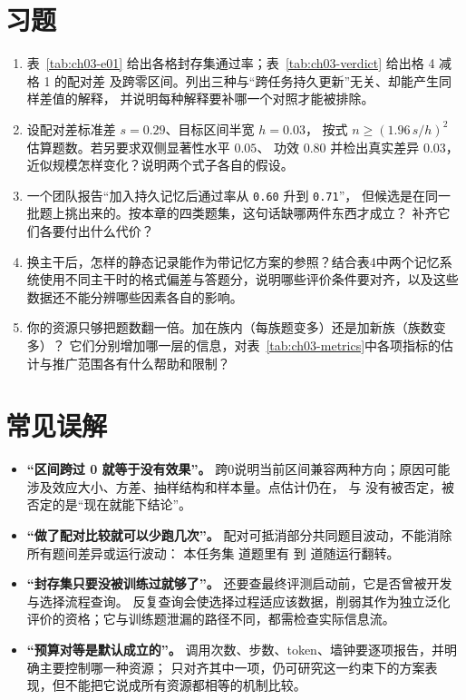 \section*{习题}
\begin{enumerate}[label=3-\arabic*.,ref=3-\arabic*]
  \item\label{ex:ch03-1} 表~\ref{tab:ch03-e01} 给出各格封存集通过率；表~\ref{tab:ch03-verdict} 给出格 4 减格 1 的配对差  及跨零区间。列出三种与“跨任务持久更新”无关、却能产生同样差值的解释，
        并说明每种解释要补哪一个对照才能被排除。
  \item\label{ex:ch03-2} 设配对差标准差 $s=0.29$、目标区间半宽 $h=0.03$，
        按式 $n\ge(1.96\,s/h)^{2}$ 估算题数。若另要求双侧显著性水平 $0.05$、
        功效 $0.80$ 并检出真实差异 $0.03$，近似规模怎样变化？说明两个式子各自的假设。
  \item\label{ex:ch03-3} 一个团队报告“加入持久记忆后通过率从 \texttt{0.60} 升到 \texttt{0.71}”，
        但候选是在同一批题上挑出来的。按本章的四类题集，这句话缺哪两件东西才成立？
        补齐它们各要付出什么代价？
  \item\label{ex:ch03-4} 换主干后，怎样的静态记录能作为带记忆方案的参照？结合\cite{anatomy-memory-2602}表4中两个记忆系统使用不同主干时的格式偏差与答题分，说明哪些评价条件要对齐，以及这些数据还不能分辨哪些因素各自的影响。
  \item\label{ex:ch03-5} 你的资源只够把题数翻一倍。加在族内（每族题变多）还是加新族（族数变多）？
        它们分别增加哪一层的信息，对表~\ref{tab:ch03-metrics}中各项指标的估计与推广范围各有什么帮助和限制？
\end{enumerate}

\section*{常见误解}
\begin{itemize}
  \item \textbf{“区间跨过 0 就等于没有效果”。}
        跨0说明当前区间兼容两种方向；原因可能涉及效应大小、方差、抽样结构和样本量。点估计仍在，
         与  没有被否定，被否定的是“现在就能下结论”。
  \item \textbf{“做了配对比较就可以少跑几次”。}
        配对可抵消部分共同题目波动，不能消除所有题间差异或运行波动：
        本任务集  道题里有  到  道随运行翻转。
  \item \textbf{“封存集只要没被训练过就够了”。}
        还要查最终评测启动前，它是否曾被开发与选择流程查询。
        反复查询会使选择过程适应该数据，削弱其作为独立泛化评价的资格；它与训练题泄漏的路径不同，都需检查实际信息流。
  \item \textbf{“预算对等是默认成立的”。}
        调用次数、步数、token、墙钟要逐项报告，并明确主要控制哪一种资源；
        只对齐其中一项，仍可研究这一约束下的方案表现，但不能把它说成所有资源都相等的机制比较。
\end{itemize}

